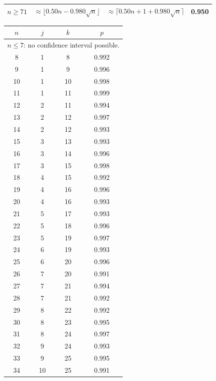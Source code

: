 \begin{table}
\begin{tabular}{|c|c|c|c|}
\hline $n \geq 71$ &
\multicolumn{1}{p{20mm}|}{$\approx \lfloor 0.50 n - 0.980 \sqrt{n}\rfloor$} &
\multicolumn{1}{p{20mm}|}{$\approx \lceil 0.50 n + 1 + 0.980 \sqrt{n}\rceil$} &
0.950 \\ \hline
\end{tabular}
 \hspace{1mm}
\hspace{1mm}
 \begin{tabular}{|c|c|c|c|}
 \hline $n$ & $j$ & $k$ & $p$ \\ \hline \hline
\multicolumn{4}{|c|}{
$n \leq 7 $: no confidence interval possible.}\\ \hline
 8  & 1  & 8 & 0.992  \\ \hline
 9  & 1  & 9 & 0.996  \\ \hline
 10  & 1  & 10 & 0.998  \\ \hline
 11  & 1  & 11 & 0.999  \\ \hline
 12  & 2  & 11 & 0.994  \\ \hline
 13  & 2  & 12 & 0.997  \\ \hline
 14  & 2  & 12 & 0.993  \\ \hline
 15  & 3  & 13 & 0.993  \\ \hline
 16  & 3  & 14 & 0.996  \\ \hline
 17  & 3  & 15 & 0.998  \\ \hline
 18  & 4  & 15 & 0.992  \\ \hline
 19  & 4  & 16 & 0.996  \\ \hline
 20  & 4  & 16 & 0.993  \\ \hline
 21  & 5  & 17 & 0.993  \\ \hline
 22  & 5  & 18 & 0.996  \\ \hline
 23  & 5  & 19 & 0.997  \\ \hline
 24  & 6  & 19 & 0.993  \\ \hline
 25  & 6  & 20 & 0.996  \\ \hline
 26  & 7  & 20 & 0.991  \\ \hline
 27  & 7  & 21 & 0.994  \\ \hline
 28  & 7  & 21 & 0.992  \\ \hline
 29  & 8  & 22 & 0.992  \\ \hline
 30  & 8  & 23 & 0.995  \\ \hline
 31  & 8  & 24 & 0.997  \\ \hline
 32  & 9  & 24 & 0.993  \\ \hline
 33  & 9  & 25 & 0.995  \\ \hline
 34  & 10  & 25 & 0.991  \\ \hline

\end{tabular}
\end{table}
